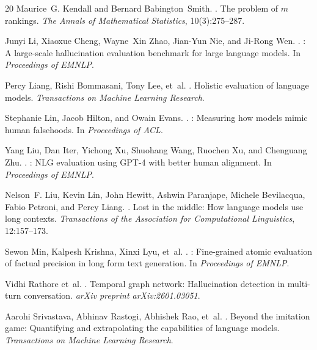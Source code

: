 \documentclass[11pt,a4paper]{article}
\begin{document}
\begin{thebibliography}{20}
Maurice~G. Kendall and Bernard Babington~Smith.
.
\newblock The problem of $m$ rankings.
\newblock \emph{The Annals of Mathematical Statistics}, 10(3):275--287.

Junyi Li, Xiaoxue Cheng, Wayne~Xin Zhao, Jian-Yun Nie, and Ji-Rong Wen.
.
: A large-scale hallucination evaluation benchmark for large language models.
\newblock In \emph{Proceedings of EMNLP}.

Percy Liang, Rishi Bommasani, Tony Lee, et~al.
.
\newblock Holistic evaluation of language models.
\newblock \emph{Transactions on Machine Learning Research}.

Stephanie Lin, Jacob Hilton, and Owain Evans.
.
: Measuring how models mimic human falsehoods.
\newblock In \emph{Proceedings of ACL}.

Yang Liu, Dan Iter, Yichong Xu, Shuohang Wang, Ruochen Xu, and Chenguang Zhu.
.
: {NLG} evaluation using {GPT-4} with better human alignment.
\newblock In \emph{Proceedings of EMNLP}.

Nelson~F. Liu, Kevin Lin, John Hewitt, Ashwin Paranjape, Michele Bevilacqua, Fabio Petroni, and Percy Liang.
.
\newblock Lost in the middle: How language models use long contexts.
\newblock \emph{Transactions of the Association for Computational Linguistics}, 12:157--173.

Sewon Min, Kalpesh Krishna, Xinxi Lyu, et~al.
.
: Fine-grained atomic evaluation of factual precision in long form text generation.
\newblock In \emph{Proceedings of EMNLP}.

Vidhi Rathore et~al.
.
\newblock Temporal graph network: Hallucination detection in multi-turn conversation.
\newblock \emph{arXiv preprint arXiv:2601.03051}.

Aarohi Srivastava, Abhinav Rastogi, Abhishek Rao, et~al.
.
\newblock Beyond the imitation game: Quantifying and extrapolating the capabilities of language models.
\newblock \emph{Transactions on Machine Learning Research}.


\end{thebibliography}
\end{document}
